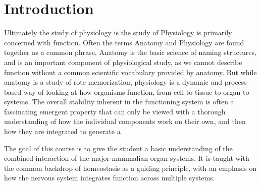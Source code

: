\documentclass[10pt,twoside,twocolumn]{article}
\begin{document}
\selectfont %


\section{Introduction}
Ultimately the study of physiology is the study of  Physiology is primarily concerned with function. Often the terms Anatomy and Physiology are found together as a common phrase. Anatomy is the basic science of naming structures, and is an important component of physiological study, as we cannot describe function without a common scientific vocabulary provided by anatomy. But while anatomy is a study of rote memorization, physiology is a dynamic and process-based way of looking at how organisms function, from cell to tissue to organ to systems. The overall stability inherent in the functioning system is often a fascinating emergent property that can only be viewed with a thorough understanding of how the individual components work on their own, and then how they are integrated to generate a  

The goal of this course is to give the student a basic understanding of the combined interaction of the major mammalian organ systems. It is taught with the common backdrop of homeostasis as a guiding principle, with an emphasis on how the nervous system integrates function across multiple systems. 
\end{document}
